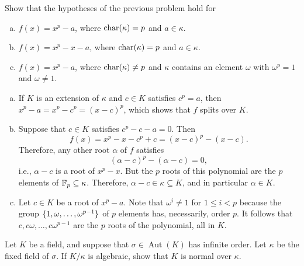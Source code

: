 \begin{probl}\label{probl:irreducibility-criterion}
    Show that the hypotheses of the previous problem hold for 
    \begin{enumerate}[a), font=\upshape]
        \item $f(x) = x^p - a$, where\/ $\operatorname{char}(\kappa) = p$ and\/ $a \in \kappa$.
        \item $f(x) = x^p - x - a$, where\/ $\operatorname{char}(\kappa) = p$ and\/ $a \in \kappa$.
        \item $f(x) = x^p - a$, where\/ $\operatorname{char}(\kappa) \ne p$ and\/ $\kappa$ contains an element\/ $\omega$ 
        with\/ $\omega^p = 1$ and\/ $\omega \ne 1$.
    \end{enumerate}
\end{probl}

\begin{solution}
    \begin{enumerate}[a), font=\upshape]
        \item If $K$ is an extension of $\kappa$ and $c\in K$ satisfies $c^p=a$, then $x^p-a=x^p-c^p=(x-c)^p$, which shows that $f$ splits over $K$.

        \item Suppose that $c\in K$ satisfies $c^p-c-a=0$. Then
        $$
            f(x)=x^p-x - c^p + c = (x-c)^p - (x-c). 
        $$
        Therefore, any other root $\alpha$ of $f$ satisfies
        $$
            (\alpha-c)^p - (\alpha-c)=0,
        $$
        i.e., $\alpha-c$ is a root of $x^p-x$. But the $p$ roots of this polynomial are the $p$ elements of $\mathbb F_p\subseteq\kappa$. Therefore, $\alpha-c\in\kappa\subseteq K$, and in particular $\alpha\in K$.

        \item Let $c\in K$ be a root of $x^p-a$. Note that $\omega^i\ne1$ for $1\le i<p$ because the group $\{1,\omega,\dots,\omega^{p-1}\}$ of $p$ elements has, necessarily, order $p$. It follows that $c,c\omega,\dots,c\omega^{p-1}$ are the $p$ roots of the polynomial, all in $K$.
    \end{enumerate}
\end{solution}

\begin{probl}
    Let\/ $K$ be a field, and suppose that\/ $\sigma \in \operatorname{Aut}(K)$ has infinite order. Let\/ $\kappa$ be the fixed field of\/ $\sigma$. If\/ $K / \kappa$ is algebraic, show that\/ $K$ is normal over\/ $\kappa$.
\end{probl}

